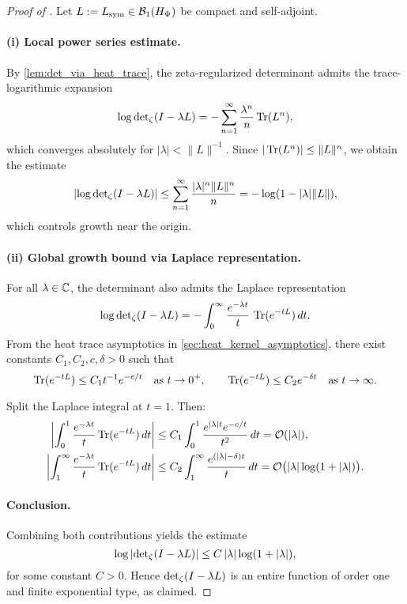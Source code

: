 \begin{proof}[Proof of ]
Let \( L := L_{\mathrm{sym}} \in \mathcal{B}_1(H_{\Psi}) \) be compact and self-adjoint.

\paragraph{(i) Local power series estimate.}
By \cref{lem:det_via_heat_trace}, the zeta-regularized determinant admits the trace-logarithmic expansion
\[
\log \det\nolimits_{\zeta}(I - \lambda L)
= - \sum_{n=1}^\infty \frac{\lambda^n}{n} \operatorname{Tr}(L^n),
\]
which converges absolutely for \( |\lambda| < \|L\|^{-1} \). Since \( |\operatorname{Tr}(L^n)| \le \|L\|^n \), we obtain the estimate
\[
\left| \log \det\nolimits_{\zeta}(I - \lambda L) \right|
\le \sum_{n=1}^\infty \frac{|\lambda|^n \|L\|^n}{n}
= -\log(1 - |\lambda| \|L\|),
\]
which controls growth near the origin.

\paragraph{(ii) Global growth bound via Laplace representation.}
For all \( \lambda \in \mathbb{C} \), the determinant also admits the Laplace representation
\[
\log \det\nolimits_{\zeta}(I - \lambda L)
= - \int_0^\infty \frac{e^{-\lambda t}}{t} \, \operatorname{Tr}(e^{-tL}) \, dt.
\]
From the heat trace asymptotics in \cref{sec:heat_kernel_asymptotics}, there exist constants \( C_1, C_2, c, \delta > 0 \) such that
\[
\operatorname{Tr}(e^{-tL}) \le C_1 t^{-1} e^{-c/t} \quad \text{as } t \to 0^+, \qquad
\operatorname{Tr}(e^{-tL}) \le C_2 e^{-\delta t} \quad \text{as } t \to \infty.
\]

Split the Laplace integral at \( t = 1 \). Then:
\begin{align*}
\left| \int_0^1 \frac{e^{-\lambda t}}{t} \operatorname{Tr}(e^{-tL})\, dt \right|
&\le C_1 \int_0^1 \frac{e^{|\lambda| t} e^{-c/t}}{t^2} \, dt = \mathcal{O}(|\lambda|), \\
\left| \int_1^\infty \frac{e^{-\lambda t}}{t} \operatorname{Tr}(e^{-tL})\, dt \right|
&\le C_2 \int_1^\infty \frac{e^{(|\lambda| - \delta)t}}{t} \, dt = \mathcal{O}\big(|\lambda| \log(1 + |\lambda|)\big).
\end{align*}

\paragraph{Conclusion.}
Combining both contributions yields the estimate
\[
\log \left| \det\nolimits_{\zeta}(I - \lambda L) \right| \le C\, |\lambda| \log(1 + |\lambda|),
\]
for some constant \( C > 0 \). Hence \( \det\nolimits_{\zeta}(I - \lambda L) \) is an entire function of order one and finite exponential type, as claimed.
\end{proof}
